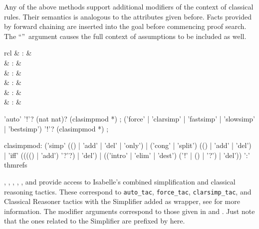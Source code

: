 \begin{isabellebody}
\begin{isamarkuptext}
  Any of the above methods support additional modifiers of the context
  of classical rules.  Their semantics is analogous to the attributes
  given before.  Facts provided by forward chaining are inserted into
  the goal before commencing proof search.  The ``\isa{{\isacharbang}}''~argument causes the full context of assumptions to be
  included as well.%
\end{isamarkuptext}%
\isamarkuptrue%
%
\isamarkuptrue%
%
\begin{isamarkuptext}%
\begin{matharray}{rcl}
    \mbox{} & : & \isarmeth \\
    \mbox{} & : & \isarmeth \\
    \mbox{} & : & \isarmeth \\
    \mbox{} & : & \isarmeth \\
    \mbox{} & : & \isarmeth \\
    \mbox{} & : & \isarmeth \\
  \end{matharray}

  \begin{rail}
    'auto' '!'? (nat nat)? (clasimpmod *)
    ;
    ('force' | 'clarsimp' | 'fastsimp' | 'slowsimp' | 'bestsimp') '!'? (clasimpmod *)
    ;

    clasimpmod: ('simp' (() | 'add' | 'del' | 'only') |
      ('cong' | 'split') (() | 'add' | 'del') |
      'iff' (((() | 'add') '?'?) | 'del') |
      (('intro' | 'elim' | 'dest') ('!' | () | '?') | 'del')) ':' thmrefs
  \end{rail}

  \begin{descr}

  \item [\mbox{\isa{auto}}, \mbox{\isa{force}}, \mbox{\isa{clarsimp}}, \mbox{\isa{fastsimp}}, \mbox{\isa{slowsimp}}, and \mbox{\isa{bestsimp}}] provide
  access to Isabelle's combined simplification and classical reasoning
  tactics.  These correspond to \verb|auto_tac|, \verb|force_tac|, \verb|clarsimp_tac|, and Classical Reasoner tactics with the Simplifier
  added as wrapper, see \cite[\S11]{isabelle-ref} for more
  information.  The modifier arguments correspond to those given in
   and .  Just note that
  the ones related to the Simplifier are prefixed by 
  here.


\end{descr}
\end{isamarkuptext}
\end{isabellebody}
